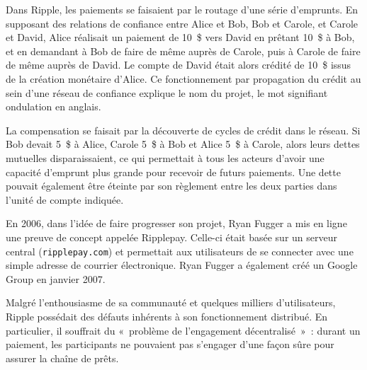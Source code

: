 Dans Ripple, les paiements se faisaient par le routage d'une série d'emprunts. En supposant des relations de confiance entre Alice et Bob, Bob et Carole, et Carole et David, Alice réalisait un paiement de 10~\$ vers David en prêtant 10~\$ à Bob, et en demandant à Bob de faire de même auprès de Carole, puis à Carole de faire de même auprès de David. Le compte de David était alors crédité de 10~\$ issus de la création monétaire d'Alice. Ce fonctionnement par propagation du crédit au sein d'une réseau de confiance explique le nom du projet, le mot  signifiant ondulation en anglais.

La compensation se faisait par la découverte de cycles de crédit dans le réseau. Si Bob devait 5~\$ à Alice, Carole 5~\$ à Bob et Alice 5~\$ à Carole, alors leurs dettes mutuelles disparaissaient, ce qui permettait à tous les acteurs d'avoir une capacité d'emprunt plus grande pour recevoir de futurs paiements. Une dette pouvait également être éteinte par son règlement entre les deux parties dans l'unité de compte indiquée.

En 2006, dans l'idée de faire progresser son projet, Ryan Fugger a mis en ligne une preuve de concept appelée Ripplepay. Celle-ci était basée sur un serveur central (\texttt{ripplepay.com}) et permettait aux utilisateurs de se connecter avec une simple adresse de courrier électronique. Ryan Fugger a également créé un Google Group en janvier 2007.

Malgré l'enthousiasme de sa communauté et quelques milliers d'utilisateurs, Ripple possédait des défauts inhérents à son fonctionnement distribué. En particulier, il souffrait du «~problème de l'engagement décentralisé~»~: durant un paiement, les participants ne pouvaient pas s'engager d'une façon sûre pour assurer la chaîne de prêts.

